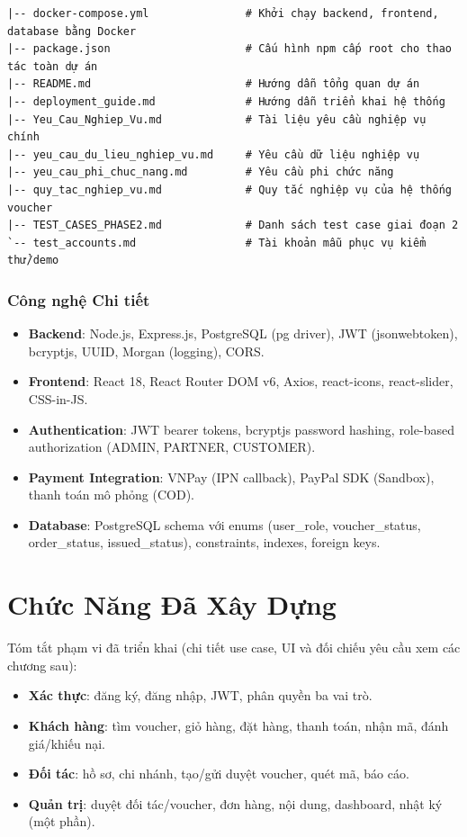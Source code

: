 ﻿\documentclass[12pt,a4paper]{report}
\begin{document}
\begin{verbatim}
|-- docker-compose.yml               # Khởi chạy backend, frontend, database bằng Docker
|-- package.json                     # Cấu hình npm cấp root cho thao tác toàn dự án
|-- README.md                        # Hướng dẫn tổng quan dự án
|-- deployment_guide.md              # Hướng dẫn triển khai hệ thống
|-- Yeu_Cau_Nghiep_Vu.md             # Tài liệu yêu cầu nghiệp vụ chính
|-- yeu_cau_du_lieu_nghiep_vu.md     # Yêu cầu dữ liệu nghiệp vụ
|-- yeu_cau_phi_chuc_nang.md         # Yêu cầu phi chức năng
|-- quy_tac_nghiep_vu.md             # Quy tắc nghiệp vụ của hệ thống voucher
|-- TEST_CASES_PHASE2.md             # Danh sách test case giai đoạn 2
`-- test_accounts.md                 # Tài khoản mẫu phục vụ kiểm thử/demo
\end{verbatim}

\newpage
\subsection{Công nghệ Chi tiết}

\begin{itemize}[leftmargin=1.2cm]
  \item \textbf{Backend}: Node.js, Express.js, PostgreSQL (pg driver), JWT (jsonwebtoken), bcryptjs, UUID, Morgan (logging), CORS.
  \item \textbf{Frontend}: React 18, React Router DOM v6, Axios, react-icons, react-slider, CSS-in-JS.
  \item \textbf{Authentication}: JWT bearer tokens, bcryptjs password hashing, role-based authorization (ADMIN, PARTNER, CUSTOMER).
  \item \textbf{Payment Integration}: VNPay (IPN callback), PayPal SDK (Sandbox), thanh toán mô phỏng (COD).
  \item \textbf{Database}: PostgreSQL schema với enums (user\_role, voucher\_status, order\_status, issued\_status), constraints, indexes, foreign keys.
\end{itemize}

\chapter{Chức Năng Đã Xây Dựng}
Tóm tắt phạm vi đã triển khai (chi tiết use case, UI và đối chiếu yêu cầu xem các chương sau):
\begin{itemize}[leftmargin=1.2cm]
  \item \textbf{Xác thực}: đăng ký, đăng nhập, JWT, phân quyền ba vai trò.
  \item \textbf{Khách hàng}: tìm voucher, giỏ hàng, đặt hàng, thanh toán, nhận mã, đánh giá/khiếu nại.
  \item \textbf{Đối tác}: hồ sơ, chi nhánh, tạo/gửi duyệt voucher, quét mã, báo cáo.
  \item \textbf{Quản trị}: duyệt đối tác/voucher, đơn hàng, nội dung, dashboard, nhật ký (một phần).
\end{itemize}
\end{document}
